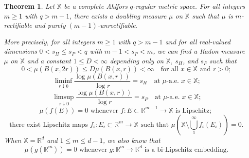 \documentclass[12pt]{amsart}
\newtheorem{theorem}{Theorem}[section]
\theoremstyle{definition}
\theoremstyle{remark}
\newcommand{\RR}{\mathbb{R}}
\newcommand{\XX}{\mathbb{X}}
\numberwithin{figure}{section}
\numberwithin{equation}{section}
\begin{document}
\begin{theorem}\label{t:main} Let $\XX$ be a complete Ahlfors $q$-regular metric space. For all integers $m\geq 1$ with $q>m-1$, there exists a doubling measure $\mu$ on $\XX$ such that $\mu$ is $m$-rectifiable and purely $(m-1)$-unrectifiable.

More precisely, for all integers $m\geq 1$ with $q>m-1$ and for all real-valued dimensions $0<s_H\leq s_P<q$ with $m-1<s_P< m$, we can find a Radon measure $\mu$ on $\XX$ and a constant $1\leq D<\infty$ depending only on $\XX$, $s_H$, and $s_P$ such that
\begin{equation}\label{doubling} 0<\mu(B(x,2r))\leq D\mu(B(x,r))<\infty\quad\text{for all $x\in\XX$ and $r>0$};\end{equation}
\begin{equation}\label{haus-dim-s}\liminf_{r\downarrow 0} \frac{\log\mu(B(x,r))}{\log r}=s_H\quad\text{at $\mu$-a.e.~$x\in\XX$;}\end{equation}
\begin{equation}\label{pack-dim-s}\limsup_{r\downarrow 0} \frac{\log\mu(B(x,r))}{\log r}=s_P\quad\text{at $\mu$-a.e.~$x\in\XX$;}\end{equation}
\begin{equation}\label{unrectifiable}\text{$\mu(f(E))=0$ whenever $f:E\subset\RR^{m-1}\rightarrow\XX$ is Lipschitz; }\end{equation}
\begin{equation}\label{m-rectifiable}\text{there exist Lipschitz maps $f_i:E_i\subset\RR^m\rightarrow\XX$ such that }\mu\left(\XX\setminus \textstyle\bigcup_1^\infty f_i(E_i)\right)=0.\end{equation} When $\XX=\RR^d$ and $1\leq m\leq d-1$, we also know that \begin{equation}\label{bi-lip-vanish}\text{$\mu(g(\RR^m))=0$ whenever $g:\RR^m\rightarrow \RR^d$ is a bi-Lipschitz embedding.}\end{equation}
\end{theorem}
\end{document}
